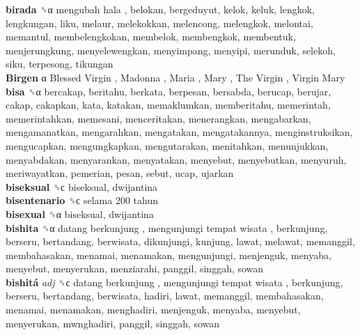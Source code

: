 \textbf{birada} ␝α   mengubah hala , belokan, bergeduyut, kelok, keluk, lengkok, lengkungan, liku, melaur, melekokkan, melencong, melengkok, melontai, memantul, membelengkokan, membelok, membengkok, membentuk, menjerungkung, menyelewengkan, menyimpang, menyipi, merunduk, selekoh, siku, terpesong, tikungan  \\
\textbf{Birgen} α   Blessed Virgin ,  Madonna ,  Maria ,  Mary ,  The Virgin ,  Virgin Mary   \\
\textbf{bisa} ␝α  bercakap, beritahu, berkata, berpesan, bersabda, berucap, berujar, cakap, cakapkan, kata, katakan, memaklumkan, memberitahu, memerintah, memerintahkan, memesani, menceritakan, menerangkan, mengabarkan, mengamanatkan, mengarahkan, mengatakan, mengatakannya, menginstruksikan, mengucapkan, mengungkapkan, mengutarakan, menitahkan, menunjukkan, menyabdakan, menyarankan, menyatakan, menyebut, menyebutkan, menyuruh, meriwayatkan, pemerian, pesan, sebut, ucap, ujarkan  \\
\textbf{biseksual} ␝ϲ  biseksual, dwijantina  \\
\textbf{bisentenario} ␝ϲ   selama 200 tahun   \\
\textbf{bisexual} ␝α  biseksual, dwijantina  \\
\textbf{bishita} ␝α   datang berkunjung ,  mengunjungi tempat wisata , berkunjung, berseru, bertandang, berwisata, dikunjungi, kunjung, lawat, melawat, memanggil, membahasakan, menamai, menamakan, mengunjungi, menjenguk, menyaba, menyebut, menyerukan, menziarahi, panggil, singgah, sowan  \\
\textbf{bishitá} \emph{adj}  ␝ϲ   datang berkunjung ,  mengunjungi tempat wisata , berkunjung, berseru, bertandang, berwisata, hadiri, lawat, memanggil, membahasakan, menamai, menamakan, menghadiri, menjenguk, menyaba, menyebut, menyerukan, mwnghadiri, panggil, singgah, sowan  \\

